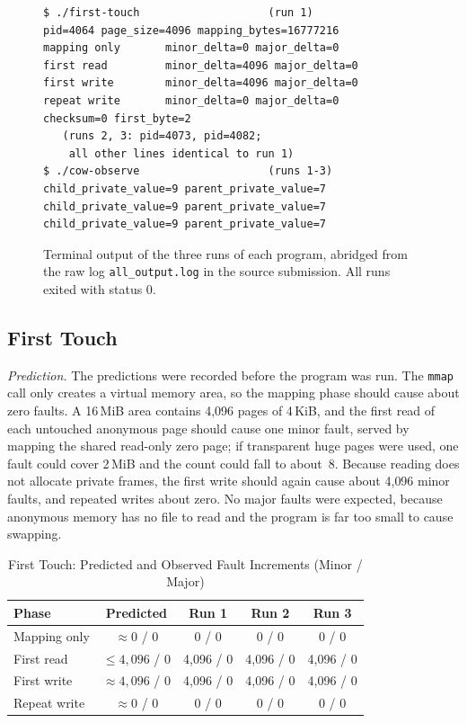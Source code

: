 \documentclass[conference,a4paper]{IEEEtran}
\newcommand{\code}[1]{\texttt{#1}}
\begin{document}
\begin{figure}[!tb]
\begin{Verbatim}[fontsize=\scriptsize, frame=single]
$ ./first-touch                    (run 1)
pid=4064 page_size=4096 mapping_bytes=16777216
mapping only       minor_delta=0 major_delta=0
first read         minor_delta=4096 major_delta=0
first write        minor_delta=4096 major_delta=0
repeat write       minor_delta=0 major_delta=0
checksum=0 first_byte=2
   (runs 2, 3: pid=4073, pid=4082;
    all other lines identical to run 1)
$ ./cow-observe                    (runs 1-3)
child_private_value=9 parent_private_value=7
child_private_value=9 parent_private_value=7
child_private_value=9 parent_private_value=7
\end{Verbatim}
\caption{Terminal output of the three runs of each program, abridged from the raw log \code{all\_output.log} in the source submission. All runs exited with status 0.}
\label{fig:log}
\end{figure}

\subsection{First Touch}
\emph{Prediction.} The predictions were recorded before the program was run. The \code{mmap} call only creates a virtual memory area, so the mapping phase should cause about zero faults. A 16\,MiB area contains 4{,}096 pages of 4\,KiB, and the first read of each untouched anonymous page should cause one minor fault, served by mapping the shared read-only zero page; if transparent huge pages were used, one fault could cover 2\,MiB and the count could fall to about~8. Because reading does not allocate private frames, the first write should again cause about 4{,}096 minor faults, and repeated writes about zero. No major faults were expected, because anonymous memory has no file to read and the program is far too small to cause swapping.

\begin{table}[!tb]
\renewcommand{\arraystretch}{1.1}
\setlength{\tabcolsep}{4pt}
\caption{First Touch: Predicted and Observed Fault Increments (Minor / Major)}
\label{tab:ft}
\centering\footnotesize
\begin{tabular}{l c c c c}
\toprule
Phase & Predicted & Run 1 & Run 2 & Run 3 \\
\midrule
Mapping only & $\approx 0$ / 0 & 0 / 0 & 0 / 0 & 0 / 0 \\
First read & $\le 4{,}096$ / 0 & 4{,}096 / 0 & 4{,}096 / 0 & 4{,}096 / 0 \\
First write & $\approx 4{,}096$ / 0 & 4{,}096 / 0 & 4{,}096 / 0 & 4{,}096 / 0 \\
Repeat write & $\approx 0$ / 0 & 0 / 0 & 0 / 0 & 0 / 0 \\
\bottomrule
\end{tabular}
\end{table}
\end{document}
